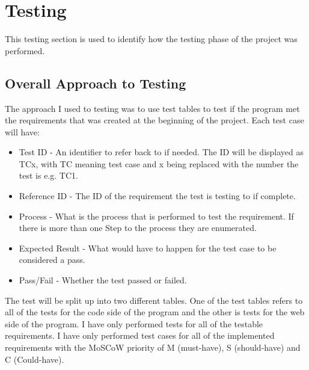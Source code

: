 \chapter{Testing}
This testing section is used to identify how the testing phase of the project was performed. 

\section{Overall Approach to Testing}
The approach I used to testing was to use test tables to test if the program met the requirements that was created at the beginning of the project. Each test case will have:
\begin{itemize}
\item Test ID - An identifier to refer back to if needed. The ID will be displayed as TCx, with TC meaning test case and x being replaced with the number the test is e.g. TC1.

\item Reference ID - The ID of the requirement the test is testing to if complete.

\item Process - What is the process that is performed to test the requirement. If there is more than one Step to the process they are enumerated.

\item Expected Result - What would have to happen for the test case to be considered a pass.

\item Pass/Fail - Whether the test passed or failed.
\end{itemize}

The test will be split up into two different tables. One of the test tables refers to all of the tests for the code side of the program and the other is tests for the web side of the program. I have only performed tests for all of the testable requirements.  
 I have only performed test cases for all of the implemented requirements with the MoSCoW priority of M (must-have), S (should-have) and C (Could-have). 

\newpage

